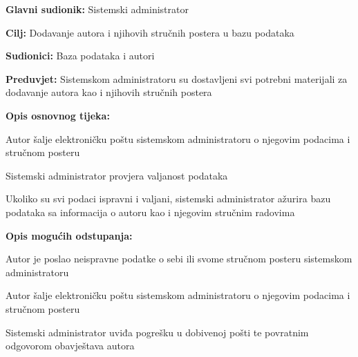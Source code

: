 				\noindent {}
				\begin{packed_item}
					
					\item \textbf{Glavni sudionik: }Sistemski administrator
					\item  \textbf{Cilj:} Dodavanje autora i njihovih stručnih postera u bazu podataka
					\item  \textbf{Sudionici:} Baza podataka i autori
					\item  \textbf{Preduvjet:} Sistemskom administratoru su dostavljeni svi potrebni materijali za dodavanje autora kao i njihovih stručnih postera
					\item  \textbf{Opis osnovnog tijeka:}
					
					\item[] \begin{packed_enum}
						
						\item Autor šalje elektroničku poštu sistemskom administratoru o njegovim podacima i stručnom posteru
						\item Sistemski administrator provjera valjanost podataka
						\item Ukoliko su svi podaci ispravni i valjani, sistemski administrator ažurira bazu podataka sa informacija o autoru kao i njegovim stručnim radovima
					
					\end{packed_enum}
					
					\item  \textbf{Opis mogućih odstupanja:}
					
					\item[] \begin{packed_item}
						
						\item[2.a] Autor je poslao neispravne podatke o sebi ili svome stručnom posteru sistemskom administratoru
						\item[] \begin{packed_enum}
							
							\item Autor šalje elektroničku poštu sistemskom administratoru o njegovim podacima i stručnom posteru
							\item Sistemski administrator uviđa pogrešku u dobivenoj pošti te povratnim odgovorom obavještava autora 
							
						\end{packed_enum}
						
					\end{packed_item}
				\end{packed_item}
				
